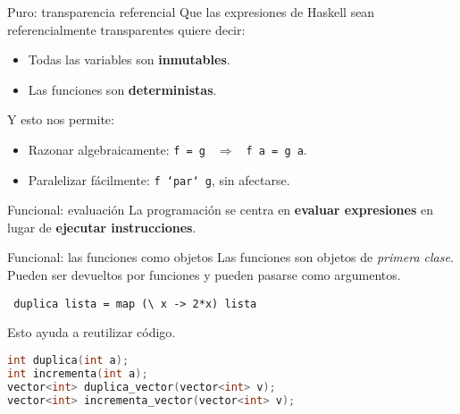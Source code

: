 \begin{frame}[fragile]{Puro: transparencia referencial}
  Que las expresiones de Haskell sean referencialmente transparentes
  quiere decir:
  \begin{itemize}
   \item Todas las variables son \textbf{inmutables}.
   \item Las funciones son \textbf{deterministas}.
  \end{itemize}

  \espacio
  
  Y esto nos permite:
  \begin{itemize}
   \item Razonar algebraicamente: \texttt{f = g } $\Rightarrow$ \texttt{ f a = g a}.
   \item Paralelizar fácilmente: \texttt{f `par` g}, sin afectarse.
  \end{itemize}

  
    
\end{frame}

\begin{frame}[fragile]{Funcional: evaluación}
  La programación se centra en \textbf{evaluar expresiones} en
  lugar de \textbf{ejecutar instrucciones}.
\end{frame}

\begin{frame}[fragile]{Funcional: las funciones como objetos}
 Las funciones son objetos de \textit{primera clase}. Pueden ser devueltos
 por funciones y pueden pasarse como argumentos.

 \begin{lstlisting}
 duplica lista = map (\ x -> 2*x) lista
 \end{lstlisting}

 \espacio
 Esto ayuda a reutilizar código.
 \begin{lstlisting}[language=C++]
int duplica(int a);
int incrementa(int a);
vector<int> duplica_vector(vector<int> v);
vector<int> incrementa_vector(vector<int> v);
 \end{lstlisting}

\end{frame}

